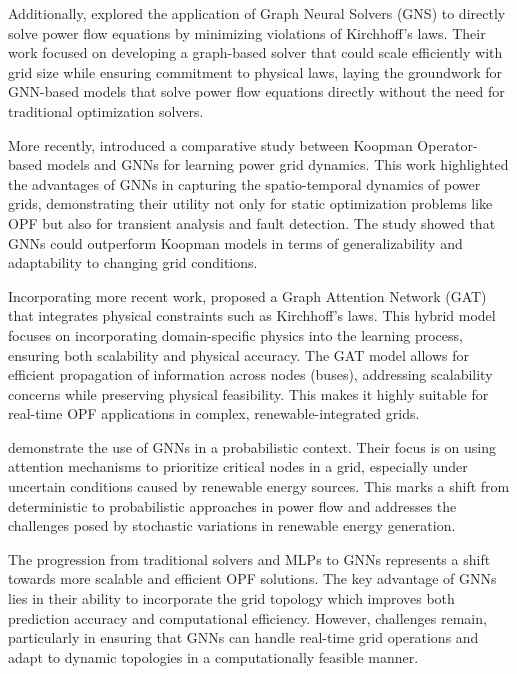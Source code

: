 Additionally, \cite{donon2020} explored the application of Graph Neural Solvers (GNS) to directly solve power flow equations by minimizing violations of Kirchhoff’s laws. Their work focused on developing a graph-based solver that could scale efficiently with grid size while ensuring commitment to physical laws, laying the groundwork for GNN-based models that solve power flow equations directly without the need for traditional optimization solvers.

More recently, \cite{fan2021} introduced a comparative study between Koopman Operator-based models and GNNs for learning power grid dynamics. This work highlighted the advantages of GNNs in capturing the spatio-temporal dynamics of power grids, demonstrating their utility not only for static optimization problems like OPF but also for transient analysis and fault detection. The study showed that GNNs could outperform Koopman models in terms of generalizability and adaptability to changing grid conditions.

Incorporating more recent work, \cite{jeddi2021} proposed a Graph Attention Network (GAT) that integrates physical constraints such as Kirchhoff's laws. This hybrid model focuses on incorporating domain-specific physics into the learning process, ensuring both scalability and physical accuracy. The GAT model allows for efficient propagation of information across nodes (buses), addressing scalability concerns while preserving physical feasibility. This makes it highly suitable for real-time OPF applications in complex, renewable-integrated grids.

\cite{wu2022} demonstrate the use of GNNs in a probabilistic context. Their focus is on using attention mechanisms to prioritize critical nodes in a grid, especially under uncertain conditions caused by renewable energy sources. This marks a shift from deterministic to probabilistic approaches in power flow and addresses the challenges posed by stochastic variations in renewable energy generation.

The progression from traditional solvers and MLPs to GNNs represents a shift towards more scalable and efficient OPF solutions. The key advantage of GNNs lies in their ability to incorporate the grid topology which improves both prediction accuracy and computational efficiency. However, challenges remain, particularly in ensuring that GNNs can handle real-time grid operations and adapt to dynamic topologies in a computationally feasible manner.
